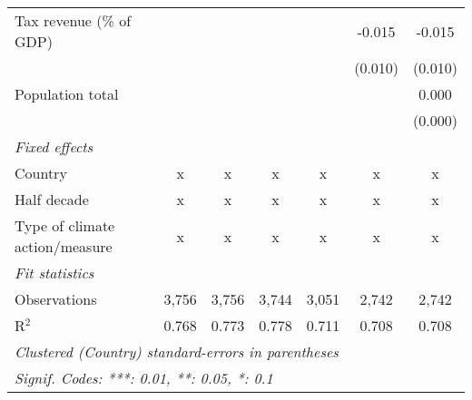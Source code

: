 \begin{tabular}{lcccccc}
   Tax revenue (\% of GDP)               &              &               &                &               & -0.015       & -0.015\\   
                                         &              &               &                &               & (0.010)      & (0.010)\\   
   Population total                      &              &               &                &               &              & 0.000\\   
                                         &              &               &                &               &              & (0.000)\\   
   \emph{Fixed effects}\\
   Country                               & x            & x             & x              & x             & x            & x\\  
   Half decade                           & x            & x             & x              & x             & x            & x\\  
   Type of climate action/measure        & x            & x             & x              & x             & x            & x\\  
   \midrule \emph{Fit statistics}\\
   Observations                          & 3,756        & 3,756         & 3,744          & 3,051         & 2,742        & 2,742\\  
   R$^2$                                 & 0.768        & 0.773         & 0.778          & 0.711         & 0.708        & 0.708\\  
   \midrule
   \multicolumn{7}{l}{\emph{Clustered (Country) standard-errors in parentheses}}\\
   \multicolumn{7}{l}{\emph{Signif. Codes: ***: 0.01, **: 0.05, *: 0.1}}\\
\end{tabular}
\par\endgroup



